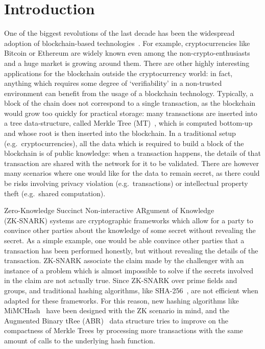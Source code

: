\section{Introduction}
One of the biggest revolutions of the last decade has been the widespread adoption of
blockchain-based technologies~\cite{NarayananBFMG2016}. 
For example, cryptocurrencies like Bitcoin or Ethereum are widely known even among the 
non-crypto-enthusiasts and a huge market is growing around them.
There are other highly interesting applications for the blockchain outside the cryptocurrency world:
in fact, anything which requires some degree of `verifiability' in a non-trusted environment can
benefit from the usage of a blockchain technology.
Typically, a block of the chain does not correspond to a single transaction, as the blockchain
would grow too quickly for practical storage: many transactions are inserted into a tree 
data-structure, called Merkle Tree (MT)~\cite{Merkle1988}, which is computed bottom-up and whose 
root is then inserted into the blockchain.
In a traditional setup (e.g.\ cryptocurrencies), all the data which is required to build a block of 
the blockchain is of public knowledge: when a transaction happens, the details of that transaction 
are shared with the network for it to be validated.
There are however many scenarios where one would like for the data to remain secret, as there could
be risks involving privacy violation (e.g.\ transactions) or intellectual property theft 
(e.g.\ shared computation).

Zero-Knowledge Succinct Non-interactive ARgument of Knowledge\\ (ZK-SNARK) systems are cryptographic
frameworks which allow for a party to convince other parties about the knowledge of some secret 
without revealing the secret.
As a simple example, one would be able convince other parties that a transaction has been performed 
honestly, but without revealing the details of the transaction.
ZK-SNARK associate the claim made by the challenger with an instance of a problem which 
is almost impossible to solve if the secrets involved in the claim are not actually true.
Since ZK-SNARK over prime fields and groups, and traditional hashing algorithms, like 
SHA-256~\cite{Dang2015}, are not efficient when adapted for these frameworks.
For this reason, new hashing algorithms like MiMCHash~\cite{AlbrechtGRRT2016} have been designed 
with the ZK scenario in mind, and the Augmented Binary tRee (ABR)~\cite{AndreevaBR2021} data 
structure tries to improve on the compactness of Merkle Trees by processing more transactions with 
the same amount of calls to the underlying hash function.

